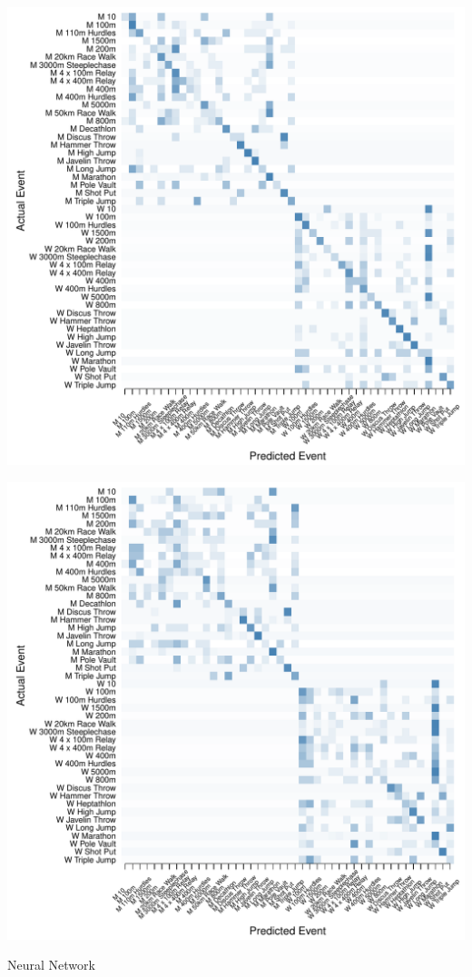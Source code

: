 \documentclass[landscape, paperwidth=42in, paperheight=36in,
fontscale=.35, margin=1in]{baposter}
\begin{document}
\begin{poster}
{\begin{center}
  \begin{minipage}{0.45\textwidth}
    \begin{center}
      \includegraphics[scale=0.27]{../graphics/athletesANN-trn.pdf}
    \end{center}
  \end{minipage}
  \hspace{0.05\textwidth}
  \begin{minipage}{0.45\textwidth}
    \begin{center}
      \includegraphics[scale=0.27]{../graphics/athletesANN-tst.pdf}
    \end{center}
  \end{minipage}
  Neural Network \\
  \end{center}

}
\end{poster}
\end{document}
